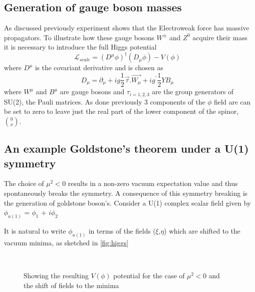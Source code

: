 \subsection{Generation of gauge boson masses}


As discussed previously experiment shows that the Electroweak force has massive propagators. To illustrate how these gauge bosons $W^{\pm}$ and $Z^{0}$ acquire their mass it is necessary to introduce the full Higgs potential
\begin{equation}
\mathcal{L}_{scale} = (D^{\mu}\phi)^{\dagger}(D_{\mu}\phi) - V(\phi)
\end{equation}
where $D^{\mu}$ is the covariant derivative and is chosen as %
\begin{equation}
  D_{\mu} = \partial_{\mu}+ig\frac{1}{2}\vec{\tau}.\vec{W_{\mu}} + ig^{'}\frac{1}{2}YB_{\mu}
  \label{eq:higgscodev}
\end{equation}
where $W^{\mu}$ and $B^{\mu}$ are gauge bosons and $\tau_{i = 1,2,3}$ are the group generators of SU(2), the Pauli matrices. As done previously 3 components of the $\phi$ field are can be set to zero to leave just the real part of the lower component of the spinor, $\binom{0}{\nu}$.
\subsection{An example Goldstone's theorem under a  U(1) symmetry}
The choice of $\mu^{2} < 0$ results in a non-zero vacuum expectation value and thus spontaneously breaks the symmetry. %
A consequence of this symmetry breaking is the generation of goldstone boson's. Consider a U(1) complex scalar field given by
$\phi_{u(1)}$ = $\phi_{1}$ + $i\phi_{2}$

It is natural to write $\phi_{u(1)}$ in terms of the fields ($\xi$,$\eta$) which are shifted to the vacuum minima, as sketched in \autoref{fig:higgs}
\begin{figure}[ht!]
  \centering
  \\
           \caption{Showing \protect{} the resulting $V(\phi)$ potential for the case of $\mu^{2}<0$ and \protect{} the shift of fields to the minima}
           \label{fig:higgs}
\end{figure}



